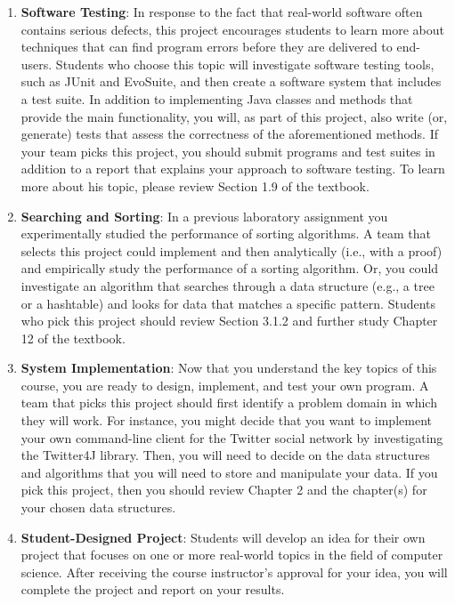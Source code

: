 \begin{enumerate}
  \item {\bf Software Testing}: In response to the fact that real-world software often contains serious defects, this
    project encourages students to learn more about techniques that can find program errors before they are delivered to
    end-users. Students who choose this topic will investigate software testing tools, such as JUnit and EvoSuite, and
    then create a software system that includes a test suite. In addition to implementing Java classes and methods that
    provide the main functionality, you will, as part of this project, also write (or, generate) tests that assess the
    correctness of the aforementioned methods. If your team picks this project, you should submit programs and test
    suites in addition to a report that explains your approach to software testing. To learn more about his topic,
    please review Section 1.9 of the textbook.

  \item {\bf Searching and Sorting}: In a previous laboratory assignment you experimentally studied the performance of
    sorting algorithms. A team that selects this project could implement and then analytically (i.e., with a proof) and
    empirically study the performance of a sorting algorithm. Or, you could investigate an algorithm that searches
    through a data structure (e.g., a tree or a hashtable) and looks for data that matches a specific pattern. Students
    who pick this project should review Section 3.1.2 and further study Chapter 12 of the textbook.

  \item {\bf System Implementation}: Now that you understand the key topics of this course, you are ready to design,
    implement, and test your own program. A team that picks this project should first identify a problem domain in which
    they will work. For instance, you might decide that you want to implement your own command-line client for the
    Twitter social network by investigating the Twitter4J library. Then, you will need to decide on the data structures
    and algorithms that you will need to store and manipulate your data. If you pick this project, then you should
    review Chapter 2 and the chapter(s) for your chosen data structures.

  \item {\bf Student-Designed Project}: Students will develop an idea for their own project that focuses on one or more
    real-world topics in the field of computer science. After receiving the course instructor's approval for your idea,
    you will complete the project and report on your results.

\end{enumerate}

